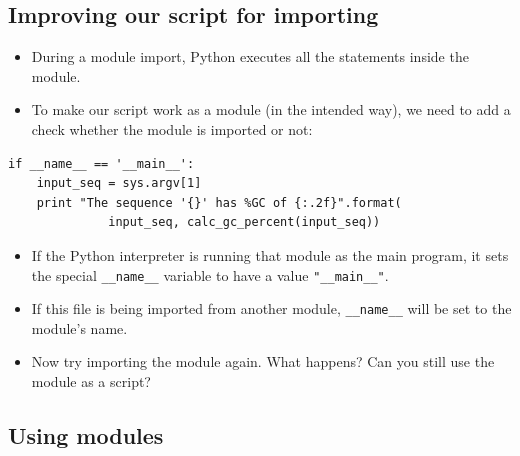 \documentclass[aspectratio=1610,slidestop]{beamer}
\newenvironment{ipython}
 {\begin{tcolorbox}[title=IPython,
                   title filled=false,
                   fonttitle=\scriptsize,
                   fontupper=\footnotesize,
                   enhanced,
                   colback=monokaibg,
                   drop small lifted shadow,
                   boxrule=0.1mm,
                   left=0.1cm,
                   arc=0mm,
                   colframe=black]}
 {\end{tcolorbox}}
\newcounter{cntr}
\renewcommand{\thecntr}{\texttt{[\arabic{cntr}]}}
\newenvironment{pythonin}[1]
{\VerbatimEnvironment
  \begin{minipage}[t]{0.11\linewidth}
   \textcolor{green}{\texttt{{\refstepcounter{cntr}In \thecntr:}}}
  \end{minipage}%
  \begin{minipage}[t]{0.89\linewidth}%
  \begin{verbatim}}
 {\end{verbatim}
 \end{minipage}}
\newenvironment{pythonout}
{%
  \addtocounter{cntr}{-1}
  \begin{minipage}[t]{0.11\linewidth}
   \textcolor{red}{\texttt{{\refstepcounter{cntr}Out\thecntr:}}}
  \end{minipage}%
  \color{ipyout}%
  \ttfamily%
  \begin{minipage}[t]{0.89\linewidth}%
}
{\end{minipage}}
\newenvironment{pythoncode}
 {\begin{tcolorbox}[title filled=false,
                    coltitle=LUMCDonkerblauw,
                    fonttitle=\scriptsize,
                    fontupper=\footnotesize,
                    enhanced,
                    drop small lifted shadow,
                    boxrule=0.1mm,
                    leftrule=5mm,
                    rulecolor=white,
                    left=0.1cm,
                    colback=white!92!black,
                    colframe=scriptback]}
 {\end{tcolorbox}}
\begin{document}
\subsection{Improving our script for importing}
\begin{pframe}
 \vspace{-.05cm}
 \begin{itemize}
  \item During a module import, Python executes all the statements inside the module.
  \item To make our script work as a module (in the intended way), we need to
  add a check whether the module is imported or not:
 \end{itemize}
 \vspace{-0.3cm}
 \begin{pythoncode}
   \begin{verbatim}
if __name__ == '__main__':
    input_seq = sys.argv[1]
    print "The sequence '{}' has %GC of {:.2f}".format(
              input_seq, calc_gc_percent(input_seq))
   \end{verbatim}
 \end{pythoncode}
 \begin{itemize}
  \item If the Python interpreter is running that module as the main program,
  it sets the special \texttt{__name__} variable to have a value
  \texttt{"__main__"}.
  \item If this file is being imported from another module,
  \texttt{__name__} will be set to the module's name.
  \item Now try importing the module again. What happens? Can you still use the
  module as a script?
 \end{itemize}
\end{pframe}


\subsection{Using modules}
\end{document}
